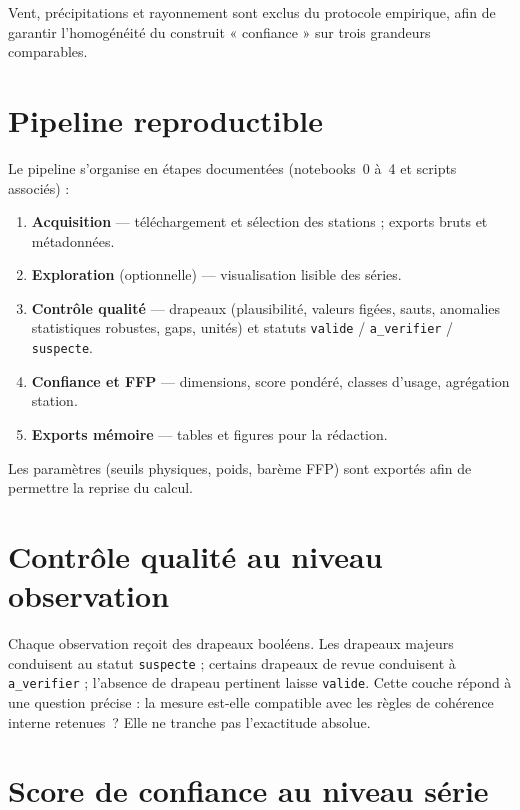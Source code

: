 \documentclass[12pt,a4paper]{report}
\begin{document}
Vent, précipitations et rayonnement sont exclus du protocole empirique, afin
de garantir l'homogénéité du construit « confiance » sur trois grandeurs
comparables.

\section{Pipeline reproductible}

Le pipeline s'organise en étapes documentées (notebooks~0 à~4 et scripts
associés) :

\begin{enumerate}
  \item \textbf{Acquisition} --- téléchargement et sélection des stations ;
        exports bruts et métadonnées.
  \item \textbf{Exploration} (optionnelle) --- visualisation lisible des
        séries.
  \item \textbf{Contrôle qualité} --- drapeaux (plausibilité, valeurs figées,
        sauts, anomalies statistiques robustes, gaps, unités) et statuts
        \texttt{valide} / \texttt{a\_verifier} / \texttt{suspecte}.
  \item \textbf{Confiance et FFP} --- dimensions, score pondéré, classes
        d'usage, agrégation station.
  \item \textbf{Exports mémoire} --- tables et figures pour la rédaction.
\end{enumerate}

Les paramètres (seuils physiques, poids, barème FFP) sont exportés afin de
permettre la reprise du calcul.

\section{Contrôle qualité au niveau observation}

Chaque observation reçoit des drapeaux booléens. Les drapeaux majeurs
conduisent au statut \texttt{suspecte} ; certains drapeaux de revue
conduisent à \texttt{a\_verifier} ; l'absence de drapeau pertinent laisse
\texttt{valide}. Cette couche répond à une question précise : la mesure est-elle
compatible avec les règles de cohérence interne retenues~? Elle ne tranche pas
l'exactitude absolue.

\section{Score de confiance au niveau série}
\end{document}
